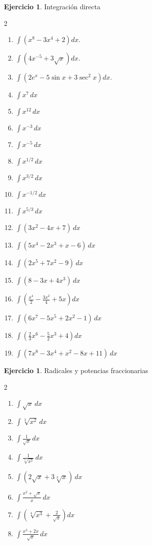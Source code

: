 \documentclass[12pt]{article}
\theoremstyle{definition}
\newtheorem{Ejer}[teorema]{Ejercicio}
\theoremstyle{remark}
\begin{document}
\begin{Ejer} Integraci\'on directa
\begin{multicols}{2}
\begin{enumerate}[series=integrales]
\item $\int(x^8-3x^4+2)dx$.
\item $\int(4x^{-5}+3\sqrt{x})dx$.
\item $\int(2e^x-5\sin x+3\sec^2x)dx$.
\item $\displaystyle \int x^7\,dx$
\item $\displaystyle \int x^{12}\,dx$
\item $\displaystyle \int x^{-3}\,dx$
\item $\displaystyle \int x^{-5}\,dx$
\item $\displaystyle \int x^{1/2}\,dx$
\item $\displaystyle \int x^{3/2}\,dx$
\item $\displaystyle \int x^{-1/2}\,dx$
\item $\displaystyle \int x^{5/3}\,dx$
\item $\displaystyle \int(3x^2-4x+7)\,dx$
\item $\displaystyle \int(5x^4-2x^3+x-6)\,dx$
\item $\displaystyle \int(2x^5+7x^2-9)\,dx$
\item $\displaystyle \int(8-3x+4x^3)\,dx$
\item $\displaystyle \int\left(\frac{x^4}{2}-\frac{3x^2}{4}+5x\right)dx$
\item $\displaystyle \int(6x^7-5x^5+2x^2-1)\,dx$
\item $\displaystyle \int\left(\frac{2}{3}x^6-\frac{5}{2}x^3+4\right)dx$
\item $\displaystyle \int(7x^8-3x^4+x^2-8x+11)\,dx$
\end{enumerate}
\end{multicols}
\end{Ejer}

\begin{Ejer}{Radicales y potencias fraccionarias}
\begin{multicols}{2}
\begin{enumerate}[resume=integrales]
\item $\displaystyle \int \sqrt{x}\,dx$
\item $\displaystyle \int \sqrt[3]{x^2}\,dx$
\item $\displaystyle \int \frac{1}{\sqrt{x}}\,dx$
\item $\displaystyle \int \frac{1}{\sqrt[3]{x^2}}\,dx$
\item $\displaystyle \int(2\sqrt{x}+3\sqrt[3]{x})\,dx$
\item $\displaystyle \int\frac{x^2+\sqrt{x}}{x}\,dx$
\item $\displaystyle \int\left(\sqrt[4]{x^3}+\frac{2}{\sqrt{x}}\right)dx$
\item $\displaystyle \int\frac{x^3+2x}{\sqrt{x}}\,dx$
\end{enumerate}
\end{multicols}
\end{Ejer}
\end{document}
